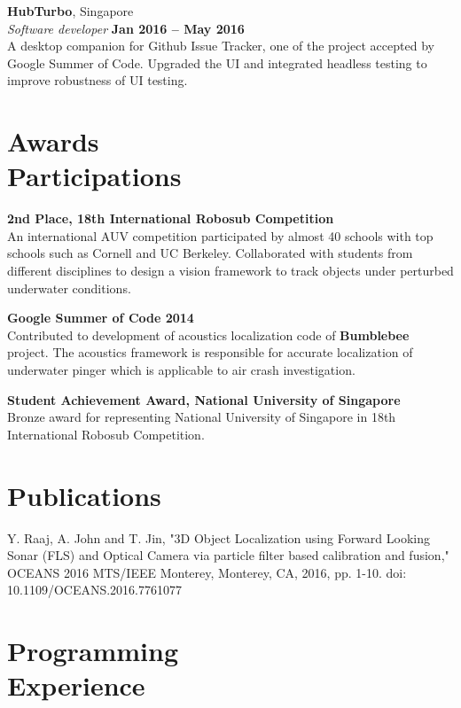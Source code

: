 \documentclass[margin,line]{resume}
\begin{document}
\begin{resume}
    \textbf{HubTurbo}, Singapore \vspace{2mm}\\\vspace{1mm}%
    \textsl{Software developer} \hfill \textbf{Jan 2016 -- May 2016}\\
    A desktop companion for Github Issue Tracker, one of the project accepted by Google Summer of
    Code. Upgraded the UI and integrated headless testing to improve robustness
    of UI testing.

    \section{\mysidestyle Awards\\Participations}

    \textbf{2nd Place, 18th International Robosub Competition}\\
    An international AUV competition participated by almost 40 schools with top
    schools such as Cornell and UC Berkeley. Collaborated with students from
    different disciplines to design a vision framework to track objects under
    perturbed underwater conditions.

    \textbf{Google Summer of Code 2014}\\
    Contributed to development of acoustics localization code of
    \textbf{Bumblebee} project. The acoustics framework is responsible for
    accurate localization of underwater pinger which is applicable to air crash investigation.

    \textbf{Student Achievement Award, National University of Singapore}\\
    Bronze award for representing National University of Singapore in 18th
    International Robosub Competition.

    \section{\mysidestyle Publications}
    Y. Raaj, A. John and T. Jin, "3D Object Localization using Forward Looking
    Sonar (FLS) and Optical Camera via particle filter based calibration and
    fusion," OCEANS 2016 MTS/IEEE Monterey, Monterey, CA, 2016, pp. 1-10.
    doi: 10.1109/OCEANS.2016.7761077

    \section{\mysidestyle Programming\\Experience}


\end{resume}
\end{document}
